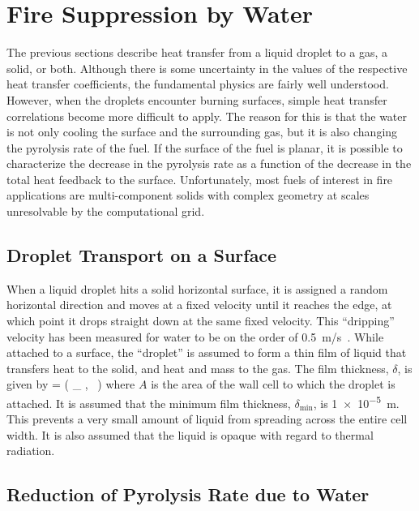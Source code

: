 \section{Fire Suppression by Water}

The previous sections describe heat transfer from a liquid droplet to a gas, a solid, or both. Although there is some
uncertainty in the values of the respective heat transfer coefficients,
the fundamental physics are fairly well understood. However, when
the droplets encounter burning surfaces,
simple heat transfer correlations become more difficult to apply.
The reason for this is that the water is not only cooling the surface
and the surrounding gas, but it is also changing the pyrolysis rate
of the fuel. If the surface of the fuel is planar, it is possible
to characterize the decrease in the pyrolysis rate as a function of
the decrease in the total heat feedback to the surface. Unfortunately,
most fuels of interest in fire applications are multi-component solids
with complex geometry at scales unresolvable by the computational grid.

\subsection{Droplet Transport on a Surface}

When a liquid droplet hits a solid horizontal surface, it is assigned a
random horizontal direction and moves at a fixed velocity until it
reaches the edge, at which point it drops straight down at the same
fixed velocity. This ``dripping'' velocity has been measured for water to be on
the order of 0.5~m/s~\cite{Hamins:1,Hamins:IAFSS2002}.
While attached to a surface, the ``droplet'' is assumed to form a thin film of liquid that
transfers heat to the solid, and heat and mass to
the gas. The film thickness, $\delta$, is given by
\be
   \delta = \max \left( \delta_{\min} , \sum {} \,  \right)
\ee
where $A$ is the area of the wall cell to which the droplet is attached. It is assumed that the minimum film thickness, $\delta_{\min}$, is \SI{1e-5}{m}. This prevents a very small amount of liquid from spreading across the entire cell width. It is also assumed that the liquid is opaque with regard to thermal radiation.

\subsection{Reduction of Pyrolysis Rate due to Water}

